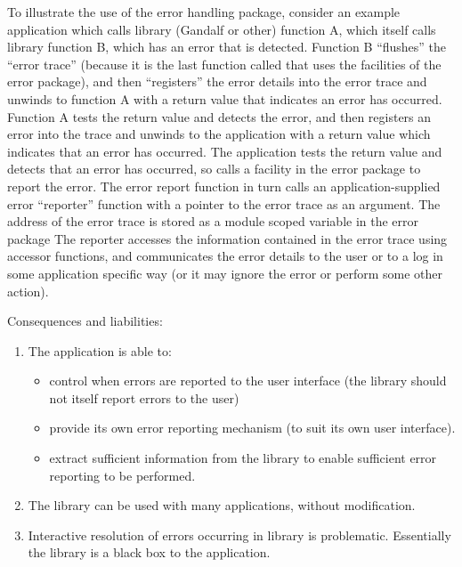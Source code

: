 To illustrate the use of the error handling package, consider an example
application which calls library (Gandalf or other) function A, which itself
calls library function B, which has an error that is detected.
Function B ``flushes'' the ``error trace'' (because it is
the last function called that uses the facilities of the error package),
and then ``registers'' the error details into the error trace and unwinds
to function A with a return value that indicates an error has occurred.
Function A tests the return value and detects the error, and then registers
an error into the trace and unwinds to the application with a return value
which indicates that an error has occurred. The application tests the return
value and detects that an error has occurred, so calls a facility in the
error package to report the error. The error report function in
turn calls an application-supplied error ``reporter'' function with
a pointer to the error trace as an argument. The address of the
error trace is stored as a module scoped variable in the error package
The reporter accesses the information contained in
the error trace using accessor functions, and communicates the
error details to the user or to a log in some application specific way
(or it may ignore the error or perform some other action).

Consequences and liabilities:
\begin{enumerate}
  \item The application is able to:
    \begin{itemize}
       \item control when errors are reported to the user interface 
             (the library should not itself report errors to the user)
       \item provide its own error reporting mechanism 
             (to suit its own user interface).
       \item extract sufficient information from the library to
             enable sufficient error reporting to be performed.
    \end{itemize}
 \item The library can be used with many applications, without modification.
 \item Interactive resolution of errors occurring in library is problematic.
      Essentially the library is a black box to the application.
\end{enumerate}

